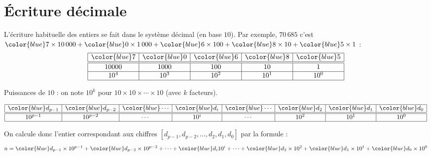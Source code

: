 \documentclass[11pt,class=report,crop=false]{standalone}
\begin{document}
\newcommand{\badletter}[1]{\underline{\textcolor{red}{#1}}}






\section*{\'Ecriture décimale}

L'écriture habituelle des entiers se fait dans le système décimal (en base $10$). Par exemple, $70\,685$ c'est 
${\color{blue}7} \times 10\,000
+{\color{blue}0} \times 1\,000
+{\color{blue}6} \times 100
+{\color{blue}8} \times 10 
+{\color{blue}5} \times 1$ : 
$$
\begin{array}{|c|c|c|c|c|}
  \hline
  {\color{blue}7} & {\color{blue}0} & {\color{blue}6} & {\color{blue}8} & {\color{blue}5} \\ 
  \hline\hline
  10000 & 1000 & 100 & 10 & 1 \\\hline
  10^4 & 10^3 & 10^2 & 10^1 & 10^0 \\
  \hline
\end{array}
$$   


\bigskip

Puissances de $10$ : on note $10^k$ pour $10 \times 10 \times \cdots \times 10$ (avec $k$ facteurs).

\bigskip

$$
\begin{array}{|c|c|c|c|c|c|c|c|}
  \hline
  {\color{blue}d_{p-1}} & {\color{blue}d_{p-2}}& {\color{blue}\cdots} & {\color{blue}d_i}& {\color{blue}\cdots} & {\color{blue}d_2} & {\color{blue}d_1} & {\color{blue}d_0} \\ 
  \hline\hline
  10^{p-1} & 10^{p-2} & \cdots & 10^i &\cdots & 10^2 & 10^1 & 10^0 \\
  \hline
\end{array}
$$   
  
On calcule donc l'entier correspondant aux chiffres $[d_{p-1},d_{p-2}, \ldots,d_2,d_1,d_0]$ par la formule :
$$n = {\color{blue}d_{p-1}} \times 10^{p-1} + {\color{blue}d_{p-2}} \times 10^{p-2} + \cdots + {\color{blue}d_i} 10^{i} +  \cdots + {\color{blue}d_2} \times 10^2 + {\color{blue}d_1} \times 10^1 + {\color{blue}d_0} \times 10^0$$
\end{document}
